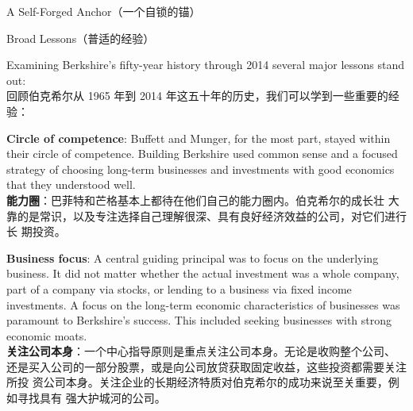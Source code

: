 \begin{section}{A Self-Forged Anchor（一个自锁的锚）}
\end{section}

\begin{section}{Broad Lessons（普适的经验）}

\begin{verseparallel}
  {
    Examining Berkshire's fifty-year history through 2014 several major
    lessons stand out: \\
  }
  {
    回顾伯克希尔从 1965 年到 2014 年这五十年的历史，我们可以学到一些重要的经验：
  }
\end{verseparallel}

{\color{green}{此处应为列表项 \\}}

\begin{verseparallel}
  {
    \textbf{Circle of competence}: Buffett and Munger, for the most part, stayed
    within their circle of competence. Building Berkshire used common sense and
    a focused strategy of choosing long-term businesses and investments with
    good economics that they understood well. \\
  }
  {
    \textbf{能力圈}：巴菲特和芒格基本上都待在他们自己的能力圈内。伯克希尔的成长壮
    大靠的是常识，以及专注选择自己理解很深、具有良好经济效益的公司，对它们进行长
    期投资。
  }
\end{verseparallel}

\begin{verseparallel}
  {
    \textbf{Business focus}: A central guiding principal was to focus on the
    underlying business. It did not matter whether the actual investment was a
    whole company, part of a company via stocks, or lending to a business via
    fixed income investments. A focus on the long-term economic characteristics
    of businesses was paramount to Berkshire's success. This included seeking
    businesses with strong economic moats. \\
  }
  {
    \textbf{关注公司本身}：一个中心指导原则是重点关注公司本身。无论是收购整个公司、
    还是买入公司的一部分股票，或是向公司放贷获取固定收益，这些投资都需要关注所投
    资公司本身。关注企业的长期经济特质对伯克希尔的成功来说至关重要，例如寻找具有
    强大护城河的公司。
  }
\end{verseparallel}


\end{section}
